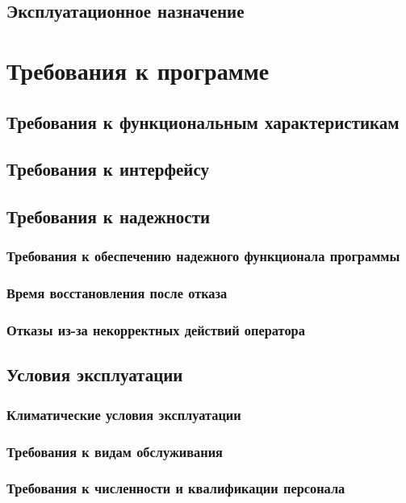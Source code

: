 \documentclass[12pt]{article}
\begin{document}
\subsection{Эксплуатационное назначение}



\newpage
\section{Требования к программе}
\subsection{Требования к функциональным характеристикам}


\subsection{Требования к интерфейсу}

\subsection{Требования к надежности}
\subsubsection{Требования к обеспечению надежного функционала программы}
\subsubsection{Время восстановления после отказа}
\subsubsection{Отказы из-за некорректных действий оператора}

\subsection{Условия эксплуатации}
\subsubsection{Климатические условия эксплуатации}
\subsubsection{Требования к видам обслуживания}
\subsubsection{Требования к численности и квалификации персонала}
\end{document}
